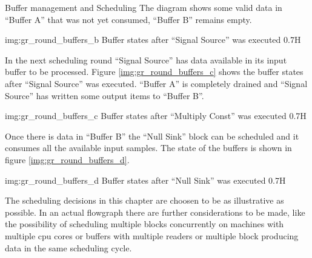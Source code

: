 \begin{subchapter}{Buffer management and Scheduling}
  The diagram shows some valid data in ``Buffer A'' that was
  not yet consumed, ``Buffer B'' remains empty.

               {img:gr_round_buffers_b}
               {Buffer states after ``Signal Source'' was executed}
               {0.7}{H}

  In the next scheduling round ``Signal Source'' has data
  available in its input buffer to be processed.
  Figure \ref{img:gr_round_buffers_c} shows the buffer states
  after ``Signal Source'' was executed.
  ``Buffer A'' is completely drained and ``Signal Source'' has
  written some output items to ``Buffer B''.

               {img:gr_round_buffers_c}
               {Buffer states after ``Multiply Const'' was executed}
               {0.7}{H}

  Once there is data in ``Buffer B'' the ``Null Sink'' block
  can be scheduled and it consumes all the available input samples.
  The state of the buffers is shown in figure \ref{img:gr_round_buffers_d}.

               {img:gr_round_buffers_d}
               {Buffer states after ``Null Sink'' was executed}
               {0.7}{H}

  The scheduling decisions in this chapter are choosen to be
  as illustrative as possible. In an actual flowgraph there are
  further considerations to be made, like the possibility of scheduling
  multiple blocks concurrently on machines with multiple \gls{cpu} cores or
  buffers with multiple readers or multiple block producing data
  in the same scheduling cycle.
\end{subchapter}


